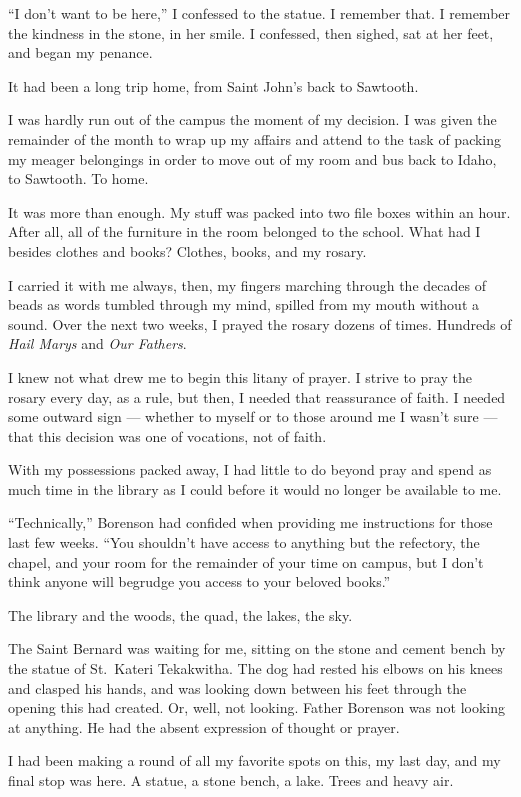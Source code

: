 ``I don't want to be here,'' I confessed to the statue. I remember that. I remember the kindness in the stone, in her smile. I confessed, then sighed, sat at her feet, and began my penance.

It had been a long trip home, from Saint John's back to Sawtooth.

I was hardly run out of the campus the moment of my decision. I was given the remainder of the month to wrap up my affairs and attend to the task of packing my meager belongings in order to move out of my room and bus back to Idaho, to Sawtooth. To home.

It was more than enough. My stuff was packed into two file boxes within an hour. After all, all of the furniture in the room belonged to the school. What had I besides clothes and books? Clothes, books, and my rosary.

I carried it with me always, then, my fingers marching through the decades of beads as words tumbled through my mind, spilled from my mouth without a sound. Over the next two weeks, I prayed the rosary dozens of times. Hundreds of \emph{Hail Marys} and \emph{Our Fathers}.

I knew not what drew me to begin this litany of prayer. I strive to pray the rosary every day, as a rule, but then, I needed that reassurance of faith. I needed some outward sign --- whether to myself or to those around me I wasn't sure --- that this decision was one of vocations, not of faith.

With my possessions packed away, I had little to do beyond pray and spend as much time in the library as I could before it would no longer be available to me.

``Technically,'' Borenson had confided when providing me instructions for those last few weeks. ``You shouldn't have access to anything but the refectory, the chapel, and your room for the remainder of your time on campus, but I don't think anyone will begrudge you access to your beloved books.''

The library and the woods, the quad, the lakes, the sky.

The Saint Bernard was waiting for me, sitting on the stone and cement bench by the statue of St.~Kateri Tekakwitha. The dog had rested his elbows on his knees and clasped his hands, and was looking down between his feet through the opening this had created. Or, well, not looking. Father Borenson was not looking at anything. He had the absent expression of thought or prayer.

I had been making a round of all my favorite spots on this, my last day, and my final stop was here. A statue, a stone bench, a lake. Trees and heavy air.

